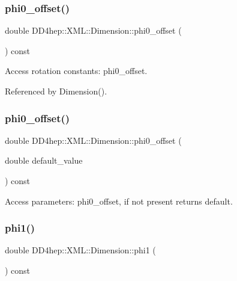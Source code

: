 \subsubsection{\texorpdfstring{phi0\+\_\+offset()}{phi0\_offset()}\hspace{0.1cm}{\footnotesize\ttfamily [1/2]}}
{\footnotesize\ttfamily double D\+D4hep\+::\+X\+M\+L\+::\+Dimension\+::phi0\+\_\+offset (\begin{DoxyParamCaption}{ }\end{DoxyParamCaption}) const}



Access rotation constants\+: phi0\+\_\+offset. 



Referenced by Dimension().

\hypertarget{struct_d_d4hep_1_1_x_m_l_1_1_dimension_a28538f2901b45889ec18404d0b788c3e}{}\label{struct_d_d4hep_1_1_x_m_l_1_1_dimension_a28538f2901b45889ec18404d0b788c3e} 
\subsubsection{\texorpdfstring{phi0\+\_\+offset()}{phi0\_offset()}\hspace{0.1cm}{\footnotesize\ttfamily [2/2]}}
{\footnotesize\ttfamily double D\+D4hep\+::\+X\+M\+L\+::\+Dimension\+::phi0\+\_\+offset (\begin{DoxyParamCaption}\item[{double}]{default\+\_\+value }\end{DoxyParamCaption}) const}



Access parameters\+: phi0\+\_\+offset, if not present returns default. 

\hypertarget{struct_d_d4hep_1_1_x_m_l_1_1_dimension_a4a79ef6ca40a9cfd8f04e26d79e9a572}{}\label{struct_d_d4hep_1_1_x_m_l_1_1_dimension_a4a79ef6ca40a9cfd8f04e26d79e9a572} 
\subsubsection{\texorpdfstring{phi1()}{phi1()}\hspace{0.1cm}{\footnotesize\ttfamily [1/2]}}
{\footnotesize\ttfamily double D\+D4hep\+::\+X\+M\+L\+::\+Dimension\+::phi1 (\begin{DoxyParamCaption}{ }\end{DoxyParamCaption}) const}



